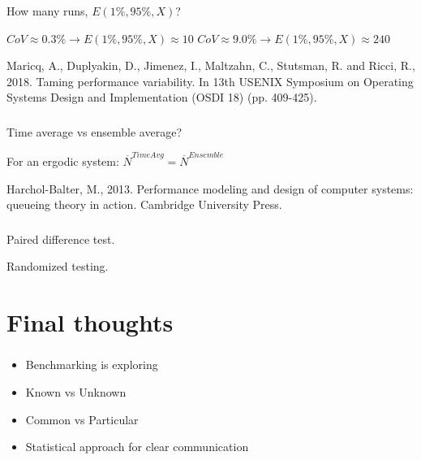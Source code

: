 \documentclass[usenames,dvipsnames, 18pt, compress, aspectratio=169]{beamer}
\begin{document}
\begin{frame}
    \frametitle{}
    \begin{center}
        How many runs, $E(1\%, 95\%, X)$?

        $CoV \approx 0.3 \% \to E(1\%, 95\%, X) \approx 10$
        $CoV \approx 9.0 \% \to E(1\%, 95\%, X) \approx 240$

    \linespread{0.5}
    \vspace{0.5cm}
    \color{black}\fontsize{6pt}{0}\selectfont
        Maricq, A., Duplyakin, D., Jimenez, I., Maltzahn, C., Stutsman, R. and
        Ricci, R., 2018. Taming performance variability. In 13th {USENIX}
        Symposium on Operating Systems Design and Implementation ({OSDI} 18)
        (pp. 409-425).
    \linespread{1.5}

    \end{center}
\end{frame}

\begin{frame}
    \frametitle{}
    \begin{center}
        Time average vs ensemble average?

        For an ergodic system: $\overline{N}^{Time Avg} = \overline{N}^{Ensemble}$

    \linespread{0.5}
    \vspace{0.5cm}
    \color{black}\fontsize{6pt}{0}\selectfont
        Harchol-Balter, M., 2013. Performance modeling and design of computer
        systems: queueing theory in action. Cambridge University Press.
    \linespread{1.5}

    \end{center}
\end{frame}

\begin{frame}
    \frametitle{}
    \begin{center}
        Paired difference test.

        Randomized testing.
    \end{center}
\end{frame}

\section{Final thoughts}

\begin{frame}
    \frametitle{}
    \begin{center}
        \begin{itemize}
            \item Benchmarking is exploring
            \item Known vs Unknown
            \item Common vs Particular
            \item Statistical approach for clear communication
        \end{itemize}
    \end{center}
\end{frame}
\end{document}
